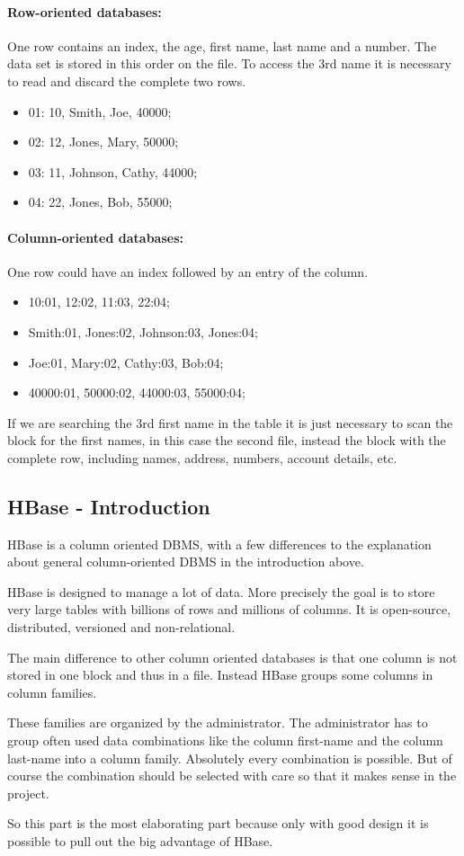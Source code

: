 \paragraph{Row-oriented databases:}
One row contains an index, the age, first name, last name and a number.
The data set is stored in this order on the file. 
To access the 3rd name it is necessary to read and discard the complete two rows.
\begin{itemize}
	\item 01: 10, Smith, Joe, 40000; 
	\item 02: 12, Jones, Mary, 50000; 
	\item 03: 11, Johnson, Cathy, 44000; 
	\item 04: 22, Jones, Bob, 55000;
\end{itemize}


\paragraph{Column-oriented databases:}
One row could have an index followed by an entry of the column.
\begin{itemize}
	\item 10:01, 12:02, 11:03, 22:04;
	\item Smith:01, Jones:02, Johnson:03, Jones:04;
	\item Joe:01, Mary:02, Cathy:03, Bob:04;
	\item 40000:01, 50000:02, 44000:03, 55000:04;
\end{itemize}
If we are searching the 3rd first name in the table it is just necessary to scan the block for the first names, in this case the second file, instead the block with the complete row, including names, address, numbers, account details, etc. 


\newpage
\subsection{HBase - Introduction}
HBase is a column oriented DBMS, with a few differences to the explanation about general column-oriented DBMS in the introduction above.

HBase is designed to manage a lot of data. 
More precisely the goal is to store very large tables with billions of rows and millions of columns.
It is open-source, distributed, versioned and non-relational.
\cite{hbase.apache.foundation.2017} \cite{hbase.hortonworks.2017}

The main difference to other column oriented databases is that one column is not stored in one block and thus in a file. 
Instead HBase groups some columns in column families.
\cite{hbase.daniel.abadi.2010}

These families are organized by the administrator.
The administrator has to group often used data combinations like the column first-name and the column last-name into a column family.
Absolutely every combination is possible.
But of course the combination should be selected with care so that it makes sense in the project.
\cite{hbase.daniel.abadi.2010}

So this part is the most elaborating part because only with good design it is possible to pull out the big advantage of HBase.
